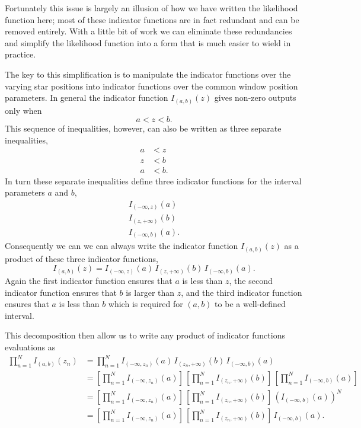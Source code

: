 \documentclass[
  letterpaper,
  DIV=11,
  numbers=noendperiod]{scrartcl}
\begin{document}
Fortunately this issue is largely an illusion of how we have written the
likelihood function here; most of these indicator functions are in fact
redundant and can be removed entirely. With a little bit of work we can
eliminate these redundancies and simplify the likelihood function into a
form that is much easier to wield in practice.

The key to this simplification is to manipulate the indicator functions
over the varying star positions into indicator functions over the common
window position parameters. In general the indicator function
\(I_{(a, b)}(z)\) gives non-zero outputs only when \[
a < z < b.
\] This sequence of inequalities, however, can also be written as three
separate inequalities, \begin{align*}
a &< z
\\
z &< b
\\
a &< b.
\end{align*} In turn these separate inequalities define three indicator
functions for the interval parameters \(a\) and \(b\), \begin{align*}
I_{(-\infty, z)}(a)
\\
I_{(z, +\infty)}(b)
\\
I_{(-\infty, b)}(a).
\end{align*} Consequently we can we can always write the indicator
function \(I_{(a, b)}(z)\) as a product of these three indicator
functions, \[
I_{(a, b)}(z)
=
I_{(-\infty, z)}(a) \, I_{(z, +\infty)}(b) \, I_{(-\infty, b)}(a).
\] Again the first indicator function ensures that \(a\) is less than
\(z\), the second indicator function ensures that \(b\) is larger than
\(z\), and the third indicator function ensures that \(a\) is less than
\(b\) which is required for \((a, b)\) to be a well-defined interval.

This decomposition then allow us to write any product of indicator
functions evaluations as \begin{align*}
\prod_{n = 1}^{N}
I_{(a, b)}(z_{n})
&=
\prod_{n = 1}^{N}
I_{(-\infty, z_{n})}(a) \, I_{(z_{n}, +\infty)}(b) \, I_{(-\infty, b)}(a)
\\
&=
\left[ \prod_{n = 1}^{N} I_{(-\infty, z_{n})}(a) \right] \,
\left[ \prod_{n = 1}^{N} I_{(z_{n}, +\infty)}(b) \right] \,
\left[ \prod_{n = 1}^{N} I_{(-\infty, b)}(a) \right]
\\
&=
\left[ \prod_{n = 1}^{N} I_{(-\infty, z_{n})}(a) \right] \,
\left[ \prod_{n = 1}^{N} I_{(z_{n}, +\infty)}(b) \right] \,
\left( I_{(-\infty, b)}(a) \right)^{N}
\\
&=
\left[ \prod_{n = 1}^{N} I_{(-\infty, z_{n})}(a) \right] \,
\left[ \prod_{n = 1}^{N} I_{(z_{n}, +\infty)}(b) \right] \,
I_{(-\infty, b)}(a).
\end{align*}
\end{document}
